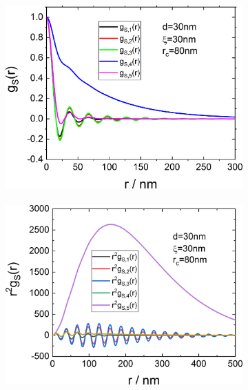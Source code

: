 \begin{figure}[htb]
\begin{subfigure}[b]{.48\textwidth}
   \centering
   \begin{minipage}[b]{1\linewidth}
             \includegraphics[width=1\linewidth]{../images/form_factor/nonparticular/gyr0_80.png}\\~\\
             \includegraphics[width=1\linewidth]{../images/form_factor/nonparticular/gyr2_80.png}\\~\\

\end{minipage}
\end{subfigure}
\end{figure}
